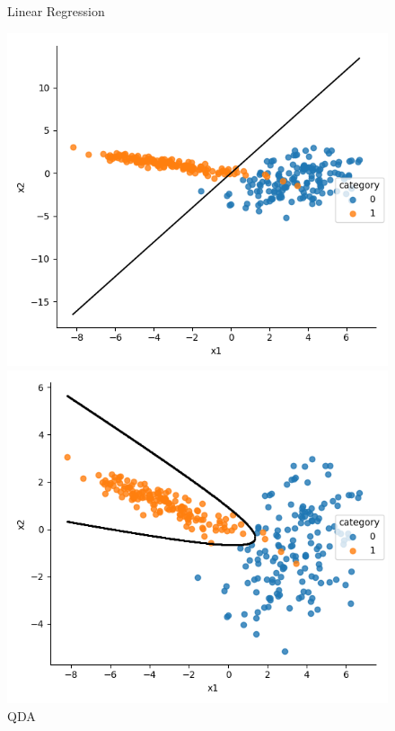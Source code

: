 \documentclass[a4paper]{article}
\begin{document}
\begin{figure}[h]
\begin{minipage}{0,45\textwidth}
\end{minipage}
\begin{minipage}{0,45\textwidth}
\caption{Linear Regression}
\includegraphics[scale=.45]{b_lr.png}
\end{minipage}
\begin{minipage}{0,45\textwidth}
\caption{QDA}
\includegraphics[scale=.45]{b_qda.png}
\end{minipage}
\end{figure}
\end{document}
